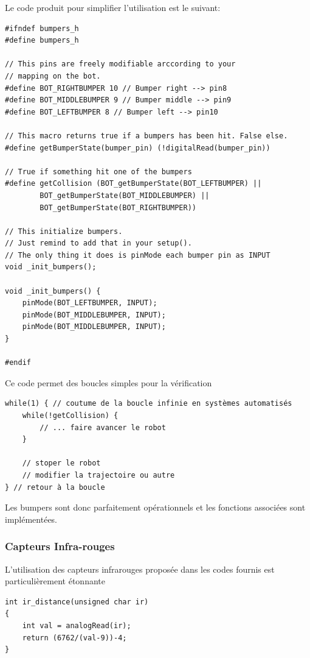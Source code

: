 \documentclass[a4paper]{report}
\begin{document}
Le code produit pour simplifier l'utilisation est le suivant:

\begin{verbatim}
#ifndef bumpers_h
#define bumpers_h

// This pins are freely modifiable arccording to your
// mapping on the bot.
#define BOT_RIGHTBUMPER 10 // Bumper right --> pin8
#define BOT_MIDDLEBUMPER 9 // Bumper middle --> pin9
#define BOT_LEFTBUMPER 8 // Bumper left --> pin10

// This macro returns true if a bumpers has been hit. False else.
#define getBumperState(bumper_pin) (!digitalRead(bumper_pin))

// True if something hit one of the bumpers
#define getCollision (BOT_getBumperState(BOT_LEFTBUMPER) ||
        BOT_getBumperState(BOT_MIDDLEBUMPER) ||
        BOT_getBumperState(BOT_RIGHTBUMPER))

// This initialize bumpers.
// Just remind to add that in your setup().
// The only thing it does is pinMode each bumper pin as INPUT
void _init_bumpers();

void _init_bumpers() {
    pinMode(BOT_LEFTBUMPER, INPUT);
    pinMode(BOT_MIDDLEBUMPER, INPUT);
    pinMode(BOT_MIDDLEBUMPER, INPUT);
}

#endif
\end{verbatim}

Ce code permet des boucles simples pour la vérification

\begin{verbatim}
while(1) { // coutume de la boucle infinie en systèmes automatisés
    while(!getCollision) {
        // ... faire avancer le robot
    }

    // stoper le robot
    // modifier la trajectoire ou autre
} // retour à la boucle
\end{verbatim}

Les bumpers sont donc parfaitement opérationnels et les fonctions associées sont implémentées.


\subsubsection{Capteurs Infra-rouges%
  \label{capteurs-infra-rouges}%
}

L'utilisation des capteurs infrarouges proposée dans les codes fournis est particulièrement étonnante

\begin{verbatim}
int ir_distance(unsigned char ir)
{
    int val = analogRead(ir);
    return (6762/(val-9))-4;
}
\end{verbatim}
\end{document}
